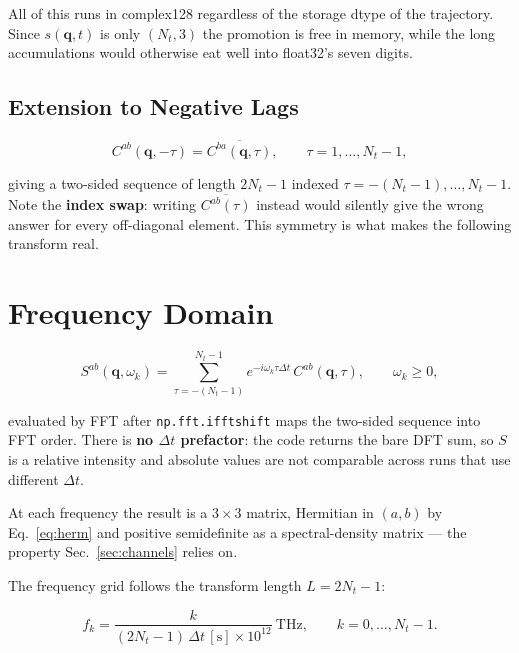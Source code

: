 \documentclass[12pt, a4paper, oneside]{article}
\newcommand{\qvec}{\mathbf{q}}
\newcommand{\Nt}{N_t}
\begin{document}
All of this runs in complex128 regardless of the storage dtype of the
trajectory. Since $s(\qvec,t)$ is only $(\Nt,3)$ the promotion is free in
memory, while the long accumulations would otherwise eat well into float32's
seven digits.

\subsection{Extension to Negative Lags}

\begin{equation}
\boxed{
    C^{ab}(\qvec,-\tau) = \overline{C^{ba}(\qvec,\tau)},
    \qquad \tau = 1,\dots,\Nt-1,
}
\label{eq:herm}
\end{equation}

giving a two-sided sequence of length $2\Nt-1$ indexed
$\tau = -(\Nt-1),\dots,\Nt-1$. Note the \textbf{index swap}: writing
$\overline{C^{ab}(\tau)}$ instead would silently give the wrong answer for every
off-diagonal element. This symmetry is what makes the following transform real.

\section{Frequency Domain}
\label{sec:freq}

\begin{equation}
\boxed{
    S^{ab}(\qvec,\omega_k) = \sum_{\tau=-(\Nt-1)}^{\Nt-1}
    e^{-i\omega_k\tau\Delta t}\,C^{ab}(\qvec,\tau),
    \qquad \omega_k \ge 0,
}
\label{eq:sqw}
\end{equation}

evaluated by FFT after \texttt{np.fft.ifftshift} maps the two-sided sequence
into FFT order. There is \textbf{no $\Delta t$ prefactor}: the code returns the
bare DFT sum, so $S$ is a relative intensity and absolute values are not
comparable across runs that use different $\Delta t$.

At each frequency the result is a $3\times3$ matrix, Hermitian in $(a,b)$ by
Eq.~\eqref{eq:herm} and positive semidefinite as a spectral-density matrix ---
the property Sec.~\ref{sec:channels} relies on.

The frequency grid follows the transform length $L = 2\Nt-1$:

\begin{equation}
    f_k = \frac{k}{(2\Nt-1)\,\Delta t\,[\mathrm{s}]\times10^{12}}\ \mathrm{THz},
    \qquad k = 0,\dots,\Nt-1.
\end{equation}
\end{document}
